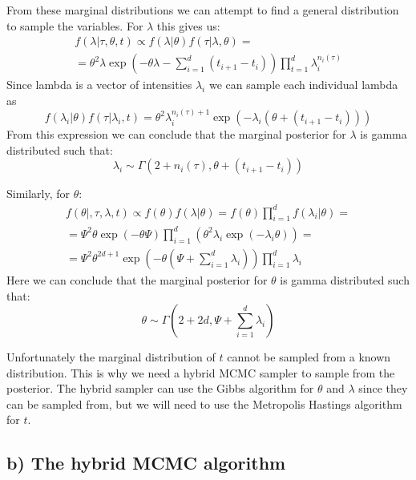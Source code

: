 \documentclass[a4paper]{article}
\begin{document}
From these marginal distributions we can attempt to find a general distribution to sample the variables. For $\lambda$ this gives us:
\begin{equation}
    \begin{gathered}
        f(\lambda | \tau, \theta, t) \propto f(\lambda|\theta)f(\tau|\lambda,\theta) = \\ = \theta^2\lambda\exp(-\theta\lambda-\sum_{i=1}^d(t_{i+1}-t_i))\prod_{t=1}^d\lambda_i^{n_i(\tau)}
    \end{gathered}
\end{equation}
Since lambda is a vector of intensities $\lambda_i$ we can sample each individual lambda as 
\begin{equation}
    f(\lambda_i|\theta)f(\tau|\lambda_i,t) = \theta^2\lambda_i^{n_i(\tau)+1}\exp(-\lambda_i(\theta + (t_{i+1}-t_i)))
\end{equation}
From this expression we can conclude that the marginal posterior for $\lambda$ is gamma distributed such that:
\begin{equation}
    \lambda_i \sim \Gamma(2+n_i(\tau), \theta + (t_{i+1} - t_i))
\end{equation}

Similarly, for $\theta$:
\begin{equation}
    \begin{gathered}
        f(\theta|, \tau, \lambda, t) \propto f(\theta)f(\lambda|\theta) = f(\theta)\prod_{i=1}^d f(\lambda_i|\theta)= \\
        = \Psi^2\theta\exp(-\theta\Psi)\prod_{i=1}^d(\theta^2\lambda_i\exp(-\lambda_i\theta)) = \\
        = \Psi^2\theta^{2d+1}\exp(-\theta(\Psi+\sum_{i=1}^d\lambda_i))\prod_{i=1}^d\lambda_i
    \end{gathered}
\end{equation}
Here we can conclude that the marginal posterior for $\theta$ is gamma distributed such that:
\begin{equation}
    \theta \sim \Gamma(2+2d, \Psi+\sum_{i=1}^d\lambda_i)
\end{equation}

Unfortunately the marginal distribution of $t$ cannot be sampled from a known distribution. This is why we need a hybrid MCMC sampler to sample from the posterior. The hybrid sampler can use the Gibbs algorithm for $\theta$ and $\lambda$ since they can be sampled from, but we will need to use the Metropolis Hastings algorithm for $t$.


\subsection*{b) The hybrid MCMC algorithm}
\end{document}
